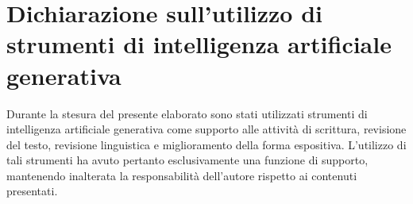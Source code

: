 \chapter*{Dichiarazione sull'utilizzo di strumenti di intelligenza artificiale generativa}

Durante la stesura del presente elaborato sono stati utilizzati strumenti di intelligenza artificiale generativa come supporto alle attività di scrittura, revisione del testo, revisione linguistica e miglioramento della forma espositiva. L'utilizzo di tali strumenti ha avuto pertanto esclusivamente una funzione di supporto, mantenendo inalterata la responsabilità dell'autore rispetto ai contenuti presentati.